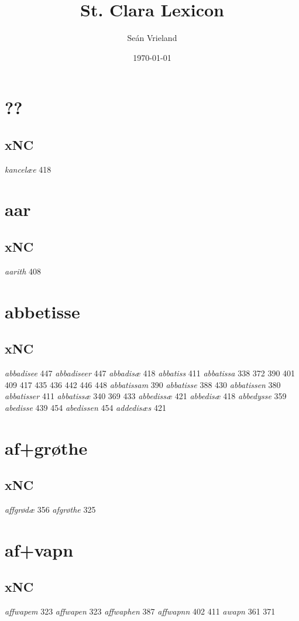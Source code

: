 \documentclass[a4paper,twocolumn]{article}
\author{Seán Vrieland}
\date{\today}
\title{St. Clara Lexicon}
\renewcommand\maketitle{}
\begin{document}
\maketitle
\section{??}
\label{sec:org87ebbdc}
\subsection{xNC}
\label{sec:org3a15cea}
\emph{kancelæe} 418 
\section{aar}
\label{sec:org8930122}
\subsection{xNC}
\label{sec:org9b1de89}
\emph{aarith} 408 
\section{abbetisse}
\label{sec:orgdbca341}
\subsection{xNC}
\label{sec:org138bae6}
\emph{abbadisee} 447 \emph{abbadiseer} 447 \emph{abbadisæ} 418 \emph{abbatiss} 411 \emph{abbatissa} 338 372 390 401 409 417 435 436 442 446 448 \emph{abbatissam} 390 \emph{abbatisse} 388 430 \emph{abbatissen} 380 \emph{abbatisser} 411 \emph{abbatissæ} 340 369 433 \emph{abbedissæ} 421 \emph{abbedisæ} 418 \emph{abbedysse} 359 \emph{abedisse} 439 454 \emph{abedissen} 454 \emph{addedisæs} 421 
\section{af+grøthe}
\label{sec:org227c826}
\subsection{xNC}
\label{sec:org6a8ce39}
\emph{affgrødæ} 356 \emph{afgrøthe} 325 
\section{af+vapn}
\label{sec:org409f808}
\subsection{xNC}
\label{sec:org6fdc1a7}
\emph{affwapem} 323 \emph{affwapen} 323 \emph{affwaphen} 387 \emph{affwapnn} 402 411 \emph{awapn} 361 371 
\end{document}
